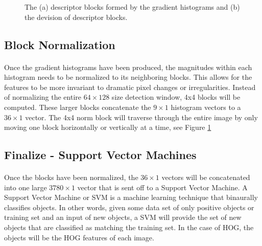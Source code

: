 \documentclass[11pt]{article}
\newcommand\simpleparagraph[1]{%
	\stepcounter{paragraph}\paragraph*{\theparagraph\quad{}#1}}
\renewcommand\theparagraph{}
\begin{document}
\begin{figure}[h]
	\centering
	\hfill
	\hfill
	\caption{The (a) descriptor blocks formed by the gradient histograms and (b) the devision of descriptor blocks. \cite{mallick_histogram_2016}}
	\label{fig:HOGBins}
\end{figure}

\subsection{Block Normalization}
\simpleparagraph{}
Once the gradient histograms have been produced, the magnitudes within each histogram needs to be normalized to its neighboring blocks. This allows for the features to be more invariant to dramatic pixel changes or irregularities. Instead of normalizing the entire $64\times 128$ size detection window, 4x4 blocks will be computed. These larger blocks concatenate the $9\times 1$ histogram vectors to a $36\times 1$ vector. The 4x4 norm block will traverse through the entire image by only moving one block horizontally or vertically at a time, see Figure \ref{fig:HOGBins}

\subsection{Finalize - Support Vector Machines}
\simpleparagraph{}
Once the blocks have been normalized, the $36\times 1$ vectors will be concatenated into one large $3780\times 1$ vector that is sent off to a Support Vector Machine. A Support Vector Machine or SVM is a machine learning technique that binaurally classifies objects. In other words, given some data set of only positive objects or training set and an input of new objects, a SVM will provide the set of new objects that are classified as matching the training set. In the case of HOG, the objects will be the HOG features of each image.
\end{document}

